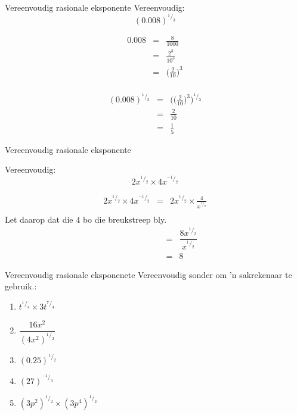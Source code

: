 \begin{wex}
{%
Vereenvoudig rasionale eksponente
} 
{%
Vereenvoudig: 
$$ (0.008)^{^1/_3} $$
}
{%

\begin{eqnarray*}
 0.008 & = & \frac{8}{1000} \\
       & = & \frac{2^3}{10^3} \\
       & = & \Big(\frac{2}{10}\Big)^3\\
\end{eqnarray*}

\begin{eqnarray*}
 (0.008)^{^1/_3} & = & \Big(\Big(\frac{2}{10}\Big)^3\Big)^{^1/_3} \\
		 & = & \frac{2}{10} \\
		 & = & \frac{1}{5}
\end{eqnarray*}
}
\end{wex}

\begin{wex}
{%
Vereenvoudig rasionale eksponente 
}

{
Vereenvoudig:
$$ 2x^{^1/_2} \times 4x^{^{-1}/_{2}} $$
}
{%
\begin{eqnarray*}
 2x^{^1/_2} \times 4x^{^{-1}/_{2}} & = & 2x^{^1/_2} \times \frac{4}{x^{^1/_2}} \\
\end{eqnarray*}
Let daarop dat die $4$ bo die breukstreep bly.\\

\begin{eqnarray*}
 \phantom{2x^{^1/_2} \times 4x^{^{-1}/_{2}}} & = & \dfrac{8x^{^1/_2}}{x^{^1/_2}} \\
					     & = & 8
\end{eqnarray*}


}
\end{wex}

\begin{exercises}{Vereenvoudig rasionale eksponenete}
Vereenvoudig sonder om ’n sakrekenaar te gebruik.:
\begin{multicols}{2}
\begin{enumerate}[noitemsep, label=\textbf{\arabic*}., itemsep=5pt]
 \item $ t^{^1/_4} \times 3t^{^7/_4} $
 \item $ \dfrac{16x^2}{(4x^2)^{^1/_2}} $
 \item $ (0.25)^{^1/_2} $
 \item $ (27)^{^{-1}/_3} $
 \item $ (3p^2)^{^1/_2} \times (3p^4)^{^1/_2} $
\end{enumerate}
\end{multicols}

 






\end{exercises}



